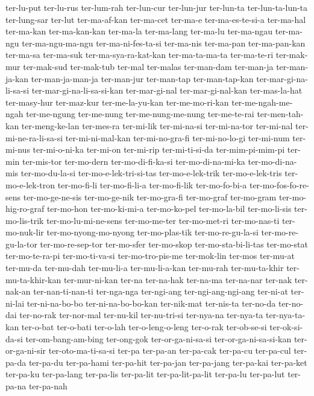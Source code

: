 {ter-lu-put ter-lu-rus ter-lum-rah ter-lun-cur ter-lun-jur ter-lun-ta
ter-lun-ta-lun-ta ter-lung-sar ter-lut ter-ma-af-kan ter-ma-cet ter-ma-e
ter-ma-es-te-si-a ter-ma-hal ter-ma-kan ter-ma-kan-kan ter-ma-la
ter-ma-lang ter-ma-lu ter-ma-ngau ter-ma-ngu ter-ma-ngu-ma-ngu
ter-ma-ni-fes-ta-si ter-ma-nis ter-ma-pan ter-ma-pan-kan ter-ma-sa
ter-ma-suk ter-ma-sya-ra-kat-kan ter-ma-ta-ma-ta ter-ma-te-ri ter-mak-mur
ter-mak-sud ter-mak-tub ter-mal ter-malas ter-man-dam ter-man-ja
ter-man-ja-kan ter-man-ja-man-ja ter-man-jur ter-man-tap ter-man-tap-kan
ter-mar-gi-na-li-sa-si ter-mar-gi-na-li-sa-si-kan ter-mar-gi-nal
ter-mar-gi-nal-kan ter-mas-la-hat ter-masy-hur ter-maz-kur
ter-me-la-yu-kan ter-me-mo-ri-kan ter-me-ngah-me-ngah ter-me-ngung
ter-me-nung ter-me-nung-me-nung ter-me-te-rai ter-men-tah-kan
ter-meng-ke-lan ter-mes-ra ter-mi-lik ter-mi-na-si ter-mi-na-tor
ter-mi-nal ter-mi-ne-ra-li-sa-si ter-mi-ni-mal-kan ter-mi-no-gra-fi
ter-mi-no-lo-gi ter-mi-num ter-mi-nus ter-mi-o-ni-ka ter-mi-on ter-mi-rip
ter-mi-ti-si-da ter-mim-pi-mim-pi ter-min ter-mis-tor ter-mo-dern
ter-mo-di-fi-ka-si ter-mo-di-na-mi-ka ter-mo-di-na-mis ter-mo-du-la-si
ter-mo-e-lek-tri-si-tas ter-mo-e-lek-trik ter-mo-e-lek-tris
ter-mo-e-lek-tron ter-mo-fi-li ter-mo-fi-li-a ter-mo-fi-lik ter-mo-fo-bi-a
ter-mo-fos-fo-re-sens ter-mo-ge-ne-sis ter-mo-ge-nik ter-mo-gra-fi
ter-mo-graf ter-mo-gram ter-mo-hig-ro-graf ter-mo-hon ter-mo-ki-mi-a
ter-mo-ko-pel ter-mo-la-bil ter-mo-li-sis ter-mo-lis-trik
ter-mo-lu-mi-ne-sens ter-mo-me-ter ter-mo-met-ri ter-mo-nas-ti
ter-mo-nuk-lir ter-mo-nyong-mo-nyong ter-mo-plas-tik ter-mo-re-gu-la-si
ter-mo-re-gu-la-tor ter-mo-re-sep-tor ter-mo-sfer ter-mo-skop
ter-mo-sta-bi-li-tas ter-mo-stat ter-mo-te-ra-pi ter-mo-ti-va-si
ter-mo-tro-pis-me ter-mok-lin ter-mos ter-mu-at ter-mu-da ter-mu-dah
ter-mu-li-a ter-mu-li-a-kan ter-mu-rah ter-mu-ta-khir ter-mu-ta-khir-kan
ter-mur-ni-kan ter-na ter-na-hak ter-na-ma ter-na-nar ter-nak ter-nak-an
ter-nan-ti-nan-ti ter-nga-nga ter-ngi-ang ter-ngi-ang-ngi-ang ter-ni-at
ter-ni-lai ter-ni-na-bo-bo ter-ni-na-bo-bo-kan ter-nik-mat ter-nis-ta
ter-no-da ter-no-dai ter-no-rak ter-nor-mal ter-nu-kil ter-nu-tri-si
ter-nya-na ter-nya-ta ter-nya-ta-kan ter-o-bat ter-o-bati ter-o-lah
ter-o-leng-o-leng ter-o-rak ter-ob-se-si ter-ok-si-da-si
ter-om-bang-am-bing ter-ong-gok ter-or-ga-ni-sa-si ter-or-ga-ni-sa-si-kan
ter-or-ga-ni-sir ter-oto-ma-ti-sa-si ter-pa ter-pa-an ter-pa-cak ter-pa-cu
ter-pa-cul ter-pa-da ter-pa-du ter-pa-hami ter-pa-hit ter-pa-jan
ter-pa-jang ter-pa-kai ter-pa-ket ter-pa-ku ter-pa-lang ter-pa-lis
ter-pa-lit ter-pa-lit-pa-lit ter-pa-lu ter-pa-lut ter-pa-na ter-pa-nah
}

